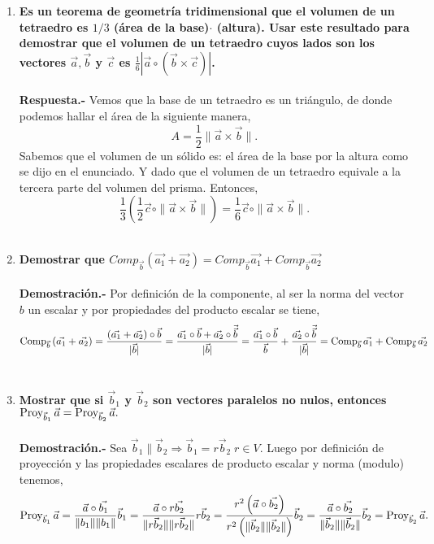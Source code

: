 \begin{enumerate}
\item \textbf{\boldmath Es un teorema de geometría tridimensional que el volumen de un tetraedro es $1/3$ (área de la base)$\cdot$ (altura). Usar este resultado para demostrar que el volumen de un tetraedro cuyos lados son los vectores $\vec{a},\vec{b}$ y $\vec{c}$ es $\frac{1}{6}\left|\vec{a}\circ \left(\vec{b}\times \vec{c}\right)\right|$.\\\\
    Respuesta.-}\; Vemos que la base de un tetraedro es un triángulo, de donde podemos hallar el área de la siguiente manera,
    $$A=\dfrac{1}{2}\|\vec{a}\times \vec{b}\|.$$
    Sabemos que el volumen de un sólido es: el área de la base por la altura como se dijo en el enunciado. Y dado que el volumen de un tetraedro equivale a la tercera parte del volumen del prisma. Entonces,
    $$\dfrac{1}{3}\left(\dfrac{1}{2}\vec{c}\circ \|\vec{a}\times \vec{b}\|\right)=\dfrac{1}{6}\vec{c}\circ \|\vec{a}\times \vec{b}\|.$$\\

\item \textbf{\boldmath Demostrar que $Comp_{\vec{b}}\left(\vec{a_1}+\vec{a_2}\right) = Comp_{\vec{b}}\vec{a_1} + Comp_{\vec{b}}\vec{a_2}$\\\\
    Demostración.-}\; Por definición de la componente, al ser la norma del vector $b$ un escalar y por propiedades del producto escalar se tiene, 
    $$\mathop{\mbox{\normalfont Comp}}\nolimits_{\vec{b}}\left(\vec{a_1}+\vec{a_2}\right) = \dfrac{\left(\vec{a_1}+\vec{a_2}\right)\circ \vec{b}}{|\vec{b}|}=\dfrac{\vec{a_1}\circ \vec{b} + \vec{a_2} \circ \vec{\vec{b}}}{|\vec{b}|} = \dfrac{\vec{a_1}\circ \vec{b}}{\vec{b}} + \dfrac{\vec{a_2} \circ \vec{\vec{b}}}{|\vec{b}|} =  \mathop{\mbox{\normalfont Comp}}\nolimits_{\vec{b}}\vec{a_1} + \mathop{\mbox{\normalfont Comp}}\nolimits_{\vec{b}}\vec{a_2}$$\\

\item \textbf{\boldmath Mostrar que si $\vec{b}_1$ y $\vec{b}_2$ son vectores paralelos no nulos, entonces $\mathop{\mbox{\normalfont Proy}}\nolimits_{\vec{b}_1}\vec{a}=\mathop{\mbox{\normalfont Proy}}\nolimits_{\vec{b}_2}\vec{a}.$\\\\
    Demostración.-}\; Sea $\vec{b}_1 \parallel \vec{b}_2  \Rightarrow  \vec{b}_1=r\vec{b}_2\; r\in V$. Luego por definición de proyección y las propiedades escalares de producto escalar y norma (modulo) tenemos,
    $$\mathop{\mbox{\normalfont Proy}}\nolimits_{\vec{b}_1}\vec{a}=\dfrac{\vec{a}\circ \vec{b_1}}{\|b_1\|\|b_1\|}\vec{b}_1=\dfrac{\vec{a}\circ r\vec{b_2}}{\|r\vec{b}_2\|\|r\vec{b}_2\|}r\vec{b}_2=\dfrac{r^2\left(\vec{a}\circ \vec{b_2}\right)}{r^2\left(\|\vec{b}_2\|\|\vec{b}_2\|\right)}\vec{b}_2=\dfrac{\vec{a}\circ \vec{b_2}}{\|\vec{b}_2\|\|\vec{b}_2\|}\vec{b}_2=\mathop{\mbox{\normalfont Proy}}\nolimits_{\vec{b}_2}\vec{a}.$$\\



\end{enumerate}
